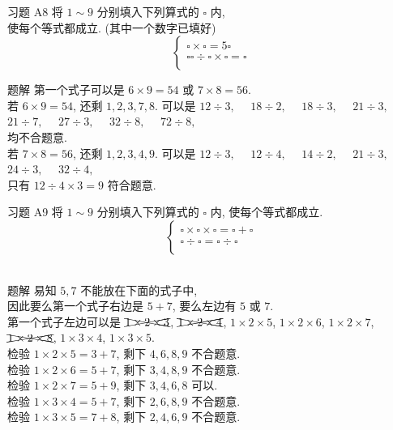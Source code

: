 \documentclass[content.tex]{subfiles}
\begin{document}
\begin{frame}{习题 A8}
将 $1 \sim 9$ 分别填入下列算式的 $\square$ 内, \\
使每个等式都成立. (其中一个数字已填好)
$$
\begin{cases}
\square \times \square = 5\square \\
\square \square \div \square \times \square = \square \\
\end{cases}
$$
\begin{exampleblock}{题解}
第一个式子可以是 $6\times 9 = 54$ 或 $7\times 8 = 56$. \\
若 $6\times 9 = 54$, 还剩 $1,2,3,7,8$. 可以是
$12 \div 3,\quad$ 
$18 \div 2,\quad$ 
$18 \div 3,\quad$  
$21 \div 3,\quad$ 
$21 \div 7,\quad$ 
$27 \div 3,\quad$ 
$32 \div 8,\quad$ 
$72 \div 8,\quad$ \\
均不合题意. \\
若 $7\times 8 = 56$, 还剩 $1,2,3,4,9$. 可以是
$12 \div 3,\quad$ 
$12 \div 4,\quad$ 
$14 \div 2,\quad$   
$21 \div 3,\quad$  
$24 \div 3,\quad$  
$32 \div 4,\quad$ \\
只有 $12 \div 4 \times 3 = 9$ 符合题意.
\end{exampleblock}
\end{frame}

\begin{frame}{习题 A9}
将 $1 \sim 9$ 分别填入下列算式的 $\square$ 内, 
使每个等式都成立. 
$$
\begin{cases}
\square \times \square \times \square = \square + \square \\
\square \div \square = \square \div \square \\
\end{cases}
$$
\\[-1em]
\begin{exampleblock}{题解}
易知 $5,7$ 不能放在下面的式子中, \\
因此要么第一个式子右边是 $5 + 7$, 要么左边有 $5$ 或 $7$. \\
第一个式子左边可以是 
$\xcancel{1\times2\times3}$, 
$\xcancel{1\times2\times4}$, 
$1\times2\times5$, 
$1\times2\times6$, 
$1\times2\times7$, 
$\xcancel{1\times2\times8}$, 
$1\times3\times4$, 
$1\times3\times5$. \\
检验 $1\times 2\times 5 = 3 + 7$, 剩下 $4,6,8,9$ 不合题意. \\
检验 $1\times 2\times 6 = 5 + 7$, 剩下 $3,4,8,9$ 不合题意. \\
检验 $1\times 2\times 7 = 5 + 9$, 剩下 $3,4,6,8$ 可以. \\
检验 $1\times 3\times 4 = 5 + 7$, 剩下 $2,6,8,9$ 不合题意. \\
检验 $1\times 3\times 5 = 7 + 8$, 剩下 $2,4,6,9$ 不合题意. \\
\end{exampleblock}
\end{frame}
\end{document}
